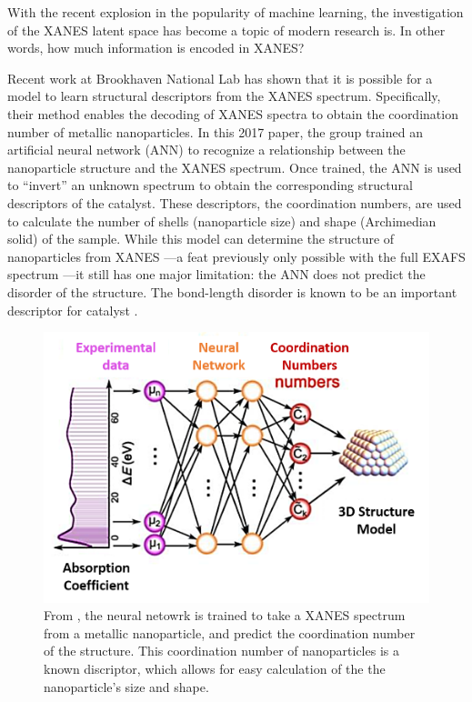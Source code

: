 With the recent explosion in the popularity of machine learning, the investigation of the XANES latent space has become a topic of modern research is. In other words, how much information is encoded in XANES?

Recent work at Brookhaven National Lab \cite{Timoshenko2017} has shown that it is possible for a model to learn structural descriptors from the XANES spectrum. Specifically, their method enables the decoding of XANES spectra to obtain the coordination number of metallic nanoparticles. In this 2017 paper, the group trained an artificial neural network (ANN) to recognize a relationship between the nanoparticle structure and the XANES spectrum. Once trained, the ANN is used to ``invert'' an unknown spectrum to obtain the corresponding structural descriptors of the catalyst. These descriptors, the coordination numbers, are used to calculate the number of shells (nanoparticle size) and shape (Archimedian solid) of the sample. While this model can determine the structure of nanoparticles from XANES ---a feat previously only possible with the full EXAFS spectrum ---it still has one major limitation: the ANN does not predict the disorder of the structure. The bond-length disorder is known to be an important descriptor for catalyst \cite{catalyst-strain-dependence} \cite{co-strain-effects}.

\begin{figure}
    \centering
    \includegraphics[width=.75\linewidth]{Chapters/Figures/placeholderFrenkel2017.png}
    \caption[ANN Metallic Nanoparticles]{From \cite{Timoshenko2017}, the neural netowrk is trained to take a XANES spectrum from a metallic nanoparticle, and predict the coordination number of the structure. This coordination number of nanoparticles is a known discriptor, which allows for easy calculation of the the nanoparticle's size and shape.}
\end{figure}

